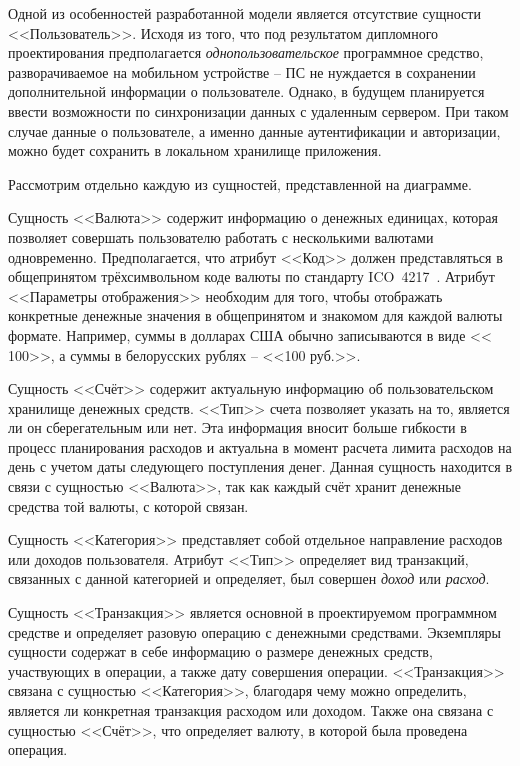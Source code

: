 Одной из особенностей разработанной модели является отсутствие сущности <<Пользователь>>.
Исходя из того, что под результатом дипломного проектирования предполагается \emph{однопользовательское} программное средство, разворачиваемое на мобильном устройстве -- ПС не нуждается в сохранении дополнительной информации о пользователе.
Однако, в будущем планируется ввести возможности по синхронизации данных с удаленным сервером.
При таком случае данные о пользователе, а именно данные аутентификации и авторизации, можно будет сохранить в локальном хранилище приложения.

Рассмотрим отдельно каждую из сущностей, представленной на диаграмме.

Сущность <<Валюта>> содержит информацию о денежных единицах, которая позволяет совершать пользователю работать с несколькими валютами одновременно.
Предполагается, что атрибут <<Код>> должен представляться в общепринятом трёхсимвольном коде валюты по стандарту ICO~4217~\cite{ico_4217}.
Атрибут <<Параметры отображения>> необходим для того, чтобы отображать конкретные денежные значения в общепринятом и знакомом для каждой валюты формате. Например, суммы в долларах США обычно записываются в виде <<$$100>>, а суммы в белорусских рублях -- <<100 руб.>>.

Сущность <<Счёт>> содержит актуальную информацию об пользовательском хранилище денежных средств.
<<Тип>> счета позволяет указать на то, является ли он сберегательным или нет.
Эта информация вносит больше гибкости в процесс планирования расходов и актуальна в момент расчета лимита расходов на день с учетом даты следующего поступления денег.
Данная сущность находится в связи с сущностью <<Валюта>>, так как каждый счёт хранит денежные средства той валюты, с которой связан.

Сущность <<Категория>> представляет собой отдельное направление расходов или доходов пользователя.
Атрибут <<Тип>> определяет вид транзакций, связанных с данной категорией и определяет, был совершен \emph{доход} или \emph{расход}.

Сущность <<Транзакция>> является основной в проектируемом программном средстве и определяет разовую операцию с денежными средствами.
Экземпляры сущности содержат в себе информацию о размере денежных средств, участвующих в операции, а также дату совершения операции.
<<Транзакция>> связана с сущностью <<Категория>>, благодаря чему можно определить, является ли конкретная транзакция расходом или доходом.
Также она связана с сущностью <<Счёт>>, что определяет валюту, в которой была проведена операция.

